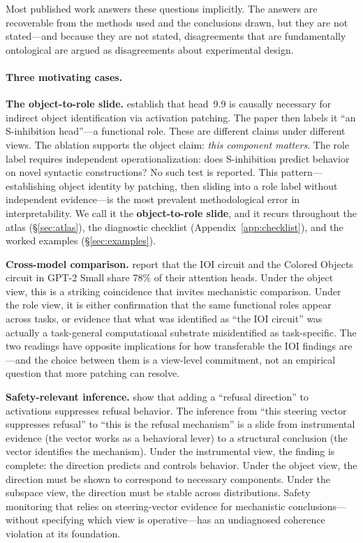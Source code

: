 \documentclass{article}
\begin{document}
Most published work answers these questions implicitly.  The answers are
recoverable from the methods used and the conclusions drawn, but they are
not stated---and because they are not stated, disagreements that are
fundamentally ontological are argued as disagreements about experimental
design.

\paragraph{Three motivating cases.}

\textbf{The object-to-role slide.}
\citet{wang2022} establish that head~9.9 is causally necessary for
indirect object identification via activation patching.  The paper then
labels it ``an S-inhibition head''---a functional role.  These are
different claims under different views.  The ablation supports the
object claim: \emph{this component matters}.  The role label requires
independent operationalization: does S-inhibition predict behavior on
novel syntactic constructions?  No such test is reported.  This
pattern---establishing object identity by patching, then sliding into a
role label without independent evidence---is the most prevalent
methodological error in interpretability.
We call it the \textbf{object-to-role slide}, and it recurs throughout
the atlas (\S\ref{sec:atlas}), the diagnostic checklist
(Appendix~\ref{app:checklist}), and the worked examples
(\S\ref{sec:examples}).

\textbf{Cross-model comparison.}
\citet{merullo2024} report that the IOI circuit and the Colored Objects
circuit in GPT-2 Small share 78\% of their attention heads.  Under the
object view, this is a striking coincidence that invites mechanistic
comparison.  Under the role view, it is either confirmation that the
same functional roles appear across tasks, or evidence that what was
identified as ``the IOI circuit'' was actually a task-general
computational substrate misidentified as task-specific.  The two
readings have opposite implications for how transferable the IOI
findings are---and the choice between them is a view-level commitment,
not an empirical question that more patching can resolve.

\textbf{Safety-relevant inference.}
\citet{turner2024} show that adding a ``refusal direction'' to
activations suppresses refusal behavior.  The inference from ``this
steering vector suppresses refusal'' to ``this is the refusal
mechanism'' is a slide from instrumental evidence (the vector works as
a behavioral lever) to a structural conclusion (the vector identifies
the mechanism).  Under the instrumental view, the finding is complete:
the direction predicts and controls behavior.  Under the object view,
the direction must be shown to correspond to necessary components.
Under the subspace view, the direction must be stable across
distributions.  Safety monitoring that relies on steering-vector
evidence for mechanistic conclusions---without specifying which view
is operative---has an undiagnosed coherence violation at its
foundation.
\end{document}
